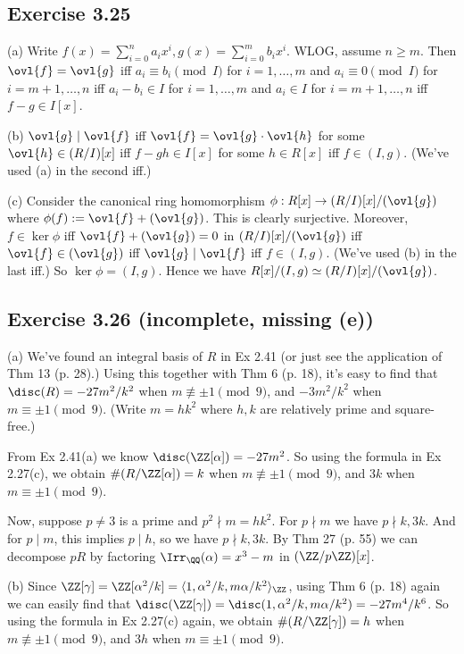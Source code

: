 \documentclass[../Chapter.tex]{subfiles}
\begin{document}
\subsection*{Exercise 3.25}

(a) Write $f(x)=\sum_{i=0}^n a_ix^i,g(x)=\sum_{i=0}^m b_ix^i$. WLOG, assume $n\geq m$. Then $\ovl{f}=\ovl{g}$ iff $a_i\equiv b_i\pmod{I}$ for $i=1,\ldots,m$ and $a_i\equiv 0\pmod{I}$ for $i=m+1,\ldots,n$ iff $a_i-b_i\in I$ for $i=1,\ldots,m$ and $a_i\in I$ for $i=m+1,\ldots,n$ iff $f-g\in I[x]$.

(b) $\ovl{g}\mid\ovl{f}$ iff $\ovl{f}=\ovl{g}\cdot\ovl{h}$ for some $\ovl{h}\in (R/I)[x]$ iff $f-gh\in I[x]$ for some $h\in R[x]$ iff $f\in(I,g)$. (We've used (a) in the second iff.)

(c) Consider the canonical ring homomorphism $\phi:R[x]\to(R/I)[x]/(\ovl{g})$ where $\phi(f):=\ovl{f}+(\ovl{g})$. This is clearly surjective. Moreover, $f\in\ker\phi$ iff $\ovl{f}+(\ovl{g})=0$ in $(R/I)[x]/(\ovl{g})$ iff $\ovl{f}\in(\ovl{g})$ iff $\ovl{g}\mid\ovl{f}$ iff $f\in(I,g)$. (We've used (b) in the last iff.) So $\ker\phi=(I,g)$. Hence we have $R[x]/(I,g)\simeq (R/I)[x]/(\ovl{g})$.

\subsection*{Exercise 3.26 \color{red}(incomplete, missing (e))}

(a) We've found an integral basis of $R$ in Ex 2.41 (or just see the application of Thm 13 (p. 28).) Using this together with Thm 6 (p. 18), it's easy to find that $\disc(R)=-27m^2/k^2$ when $m\not\equiv \pm1 \pmod{9}$, and
$-3m^2/k^2$ when $m\equiv \pm1 \pmod{9}$. (Write $m=hk^2$ where $h,k$ are relatively prime and square-free.)

From Ex 2.41(a) we know $\disc(\ZZ[\alpha])=-27m^2$. So using the formula in Ex 2.27(c), we obtain $\#(R/\ZZ[\alpha])=k$ when $m\not\equiv \pm1 \pmod{9}$, and $3k$ when $m\equiv \pm1 \pmod{9}$.

Now, suppose $p\neq 3$ is a prime and $p^2\nmid m=hk^2$. For $p\nmid m$ we have $p\nmid k,3k$. And for $p\mid m$, this implies $p\mid h$, so we have $p\nmid k,3k$. By Thm 27 (p. 55) we can decompose $pR$ by factoring $\Irr_\QQ(\alpha)=x^3-m$ in $(\ZZ/p\ZZ)[x]$.

(b) Since $\ZZ[\gamma]=\ZZ[\alpha^2/k]=\langle1,\alpha^2/k,m\alpha/k^2\rangle_\ZZ$, using Thm 6 (p. 18) again we can easily find that $\disc(\ZZ[\gamma])=\disc(1,\alpha^2/k,m\alpha/k^2)=-27m^4/k^6$. So using the formula in Ex 2.27(c) again, we obtain $\#(R/\ZZ[\gamma])=h$ when $m\not\equiv \pm1 \pmod{9}$, and $3h$ when $m\equiv \pm1 \pmod{9}$.
\end{document}
